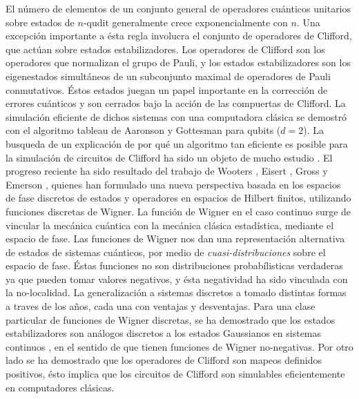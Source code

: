 \documentclass[a4paper]{report}
\begin{document}
  El número de elementos de un conjunto general de
  operadores cuánticos unitarios sobre estados de $n$-qudit
  generalmente crece exponencialmente con $n$. Una excepción
  importante a ésta regla involucra el conjunto de
  operadores de Clifford, que actúan sobre estados
  estabilizadores. Los operadores de Clifford son los
  operadores que normalizan el grupo de Pauli, y los
  estados estabilizadores son los eigenestados simultáneos
  de un subconjunto maximal de operadores de Pauli
  conmutativos. Éstos estados juegan un papel importante
  en la corrección de errores cuánticos \cite{gottesman1998}
  y son cerrados bajo la acción de las compuertas de
  Clifford. La simulación eficiente de dichos sistemas con
  una computadora clásica se demostró con el algoritmo
  tableau de Aaronson y Gottesman \cite{aaronson2004,
  gottesman1998} para qubits ($d=2$). La busqueda de un
  explicación de por qué un algoritmo tan eficiente es
  posible para la simulación de circuitos de Clifford ha
  sido un objeto de mucho estudio \cite{gottesman1999,
  howard2014, mari2012}. El progreso reciente ha sido
  resultado del trabajo de Wooters \cite{wootters1987},
  Eisert \cite{mari2012}, Gross \cite{gross2006} y Emerson
  \cite{howard2014}, quienes han formulado una nueva
  perspectiva basada en los espacios de fase discretos de
  estados y operadores en espacios de Hilbert finitos,
  utilizando funciones discretas de Wigner.  La función de
  Wigner en el caso continuo surge de vincular la mecánica
  cuántica con la mecánica clásica estadística, mediante el
  espacio de fase. Las funciones de Wigner nos dan una
  representación alternativa de estados de sistemas
  cuánticos, por medio de \textit{cuasi-distribuciones}
  sobre el espacio de fase. Éstas funciones no son
  distribuciones probabílisticas verdaderas ya que pueden
  tomar valores negativos, y ésta negatividad ha sido
  vinculada con la no-localidad. La generalización a
  sistemas discretos a tomado distintas formas a traves de
  los años, cada una con ventajas y desventajas. Para una
  clase particular de funciones de Wigner discretas, se ha
  demostrado que los estados estabilizadores son análogos
  discretos a los estados Gaussianos en sistemas continuos
  \cite{gross2006}, en el sentido de que tienen funciones de
  Wigner no-negativas. Por otro lado se ha demostrado
  que los operadores de Clifford son mapeos definidos
  positivos, ésto implica que los circuitos de Clifford son
  simulables eficientemente en computadores clásicas.
\end{document}
